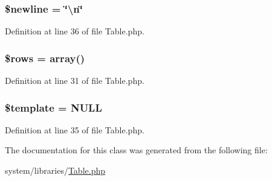 \hypertarget{class_c_i___table_a8735d5c31c4af1004825e6a28f236aeb}{
\subsubsection[{\$newline}]{\setlength{\rightskip}{0pt plus 5cm}\$newline = \char`\"{}\textbackslash{}n\char`\"{}}}\label{class_c_i___table_a8735d5c31c4af1004825e6a28f236aeb}


Definition at line 36 of file Table.\-php.

\hypertarget{class_c_i___table_ace2ec39e7df3899fa8df9640ec274b03}{
\subsubsection[{\$rows}]{\setlength{\rightskip}{0pt plus 5cm}\$rows = array()}}\label{class_c_i___table_ace2ec39e7df3899fa8df9640ec274b03}


Definition at line 31 of file Table.\-php.

\hypertarget{class_c_i___table_aa3e9534005fd516d941f6a5569896e01}{
\subsubsection[{\$template}]{\setlength{\rightskip}{0pt plus 5cm}\$template = N\-U\-L\-L}}\label{class_c_i___table_aa3e9534005fd516d941f6a5569896e01}


Definition at line 35 of file Table.\-php.



The documentation for this class was generated from the following file\-:\begin{DoxyCompactItemize}
\item 
system/libraries/\hyperlink{_table_8php}{Table.\-php}\end{DoxyCompactItemize}
